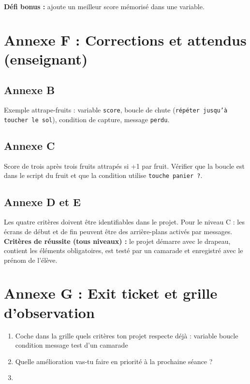 \documentclass[11pt,a4paper]{article}
\begin{document}
\textbf{Défi bonus :} ajoute un meilleur score mémorisé dans une variable.

\newpage
\section*{Annexe F : Corrections et attendus (enseignant)}

\subsection*{Annexe B}
Exemple attrape-fruits : variable \texttt{score}, boucle de chute (\texttt{répéter jusqu'à toucher le sol}), condition de capture, message \texttt{perdu}.

\subsection*{Annexe C}
Score de trois après trois fruits attrapés si +1 par fruit. Vérifier que la boucle est dans le script du fruit et que la condition utilise \texttt{touche panier ?}.

\subsection*{Annexe D et E}
Les quatre critères doivent être identifiables dans le projet. Pour le niveau C : les écrans de début et de fin peuvent être des arrière-plans activés par messages.\\
\textbf{Critères de réussite (tous niveaux) :} le projet démarre avec le drapeau, contient les éléments obligatoires, est testé par un camarade et enregistré avec le prénom de l'élève.

\newpage
\section*{Annexe G : Exit ticket et grille d'observation}

\begin{enumerate}
 \item Coche dans la grille quels critères ton projet respecte déjà : \cb variable \cb boucle \cb condition \cb message \cb test d'un camarade
 \item Quelle amélioration vas-tu faire en priorité à la prochaine séance ?\\ \lig
 \item \autoeval
\end{enumerate}

\bigskip
{}
\end{document}
